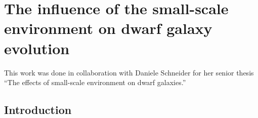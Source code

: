 \chapter[Small-scale environment]{The influence of the small-scale environment on dwarf galaxy evolution}\label{ch:smallScaleEnvironment}


This work was done in collaboration with Daniele Schneider for her senior thesis 
``The effects of small-scale environment on dwarf galaxies.''




\section[Introduction]{Introduction}

%
%

